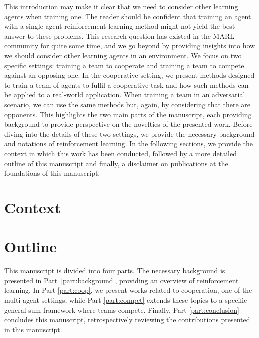 This introduction may make it clear that we need to consider other learning agents when training one.
The reader should be confident that training an agent with a single-agent reinforcement learning method might not yield the best answer to these problems.
This research question has existed in the MARL community for quite some time, and we go beyond by providing insights into how we should consider other learning agents in an environment.
We focus on two specific settings: training a team to cooperate and training a team to compete against an opposing one.
In the cooperative setting, we present methods designed to train a team of agents to fulfil a cooperative task and how such methods can be applied to a real-world application.
When training a team in an adversarial scenario, we can use the same methods but, again, by considering that there are opponents.
This highlights the two main parts of the manuscript, each providing background to provide perspective on the novelties of the presented work.
Before diving into the details of these two settings, we provide the necessary background and notations of reinforcement learning.
In the following sections, we provide the context in which this work has been conducted, followed by a more detailed outline of this manuscript and finally, a disclaimer on publications at the foundations of this manuscript.

\section{Context}
\label{sec:ch1_context}


\section{Outline}
\label{sec:ch1_outline}
This manuscript is divided into four parts.
The necessary background is presented in Part~\ref{part:background}, providing an overview of reinforcement learning.
In Part \ref{part:coop}, we present works related to cooperation, one of the multi-agent settings, while Part \ref{part:compet} extends these topics to a specific general-sum framework where teams compete.
Finally, Part \ref{part:conclusion} concludes this manuscript, retrospectively reviewing the contributions presented in this manuscript.

